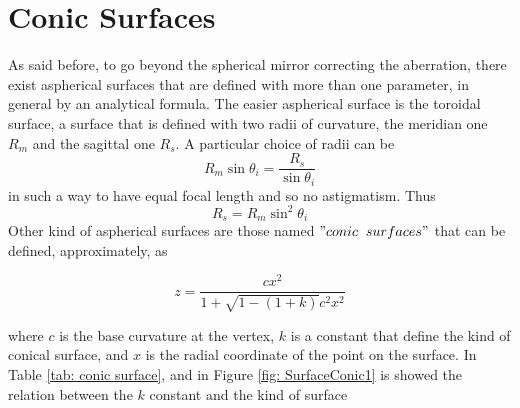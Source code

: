 \section{Conic Surfaces}
As said before, to go beyond the spherical mirror correcting the aberration, there exist aspherical surfaces that are defined with more than one parameter, in general by an analytical formula. The easier aspherical surface is the toroidal surface, a surface that is defined with two radii of curvature, the meridian one $R_m $ and the sagittal one $R_s $. A particular choice of radii can be
\begin{equation}
R_m \sin \theta_i = \frac{R_s}{\sin \theta_i}
\label{eq: toroidal 1}
\end{equation}
\noindent in such a way to have equal focal length and so no astigmatism. Thus
\begin{equation}
R_s = R_m \sin^2 \theta_i
\end{equation}
Other kind of aspherical surfaces are those named $"conic \hspace{2mm} surfaces"$ that can be defined, approximately, as

\begin{equation}
	z = \frac{c x^2}{1 + \sqrt{1 - (1 + k)} c^2 x^2}
\end{equation}

\noindent where $c $ is the base curvature at the vertex, $k $ is a constant that define the kind of conical surface, and $x $ is the radial coordinate of the point on the surface. In Table \ref{tab: conic surface}, and in Figure \ref{fig: SurfaceConic1} is showed the relation between the $k $ constant and the kind of surface

